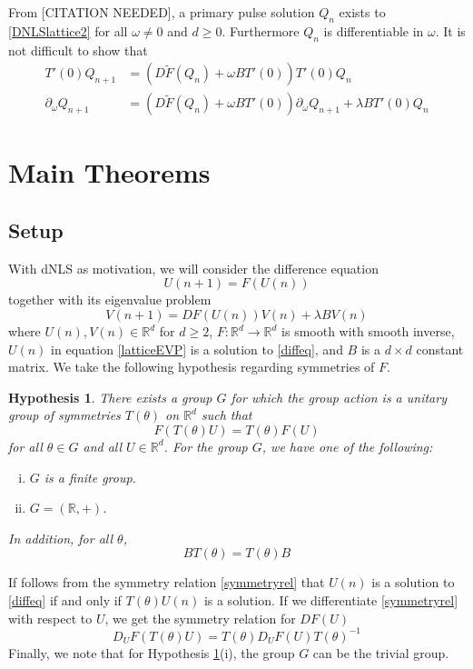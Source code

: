 \documentclass[12pt]{article}
\def\R{{\mathbb R}}
\newtheorem{hypothesis}{Hypothesis}
\begin{document}
From [CITATION NEEDED], a primary pulse solution $Q_n$ exists to \eqref{DNLSlattice2} for all $\omega \neq 0$ and $d \geq 0$. Furthermore $Q_n$ is differentiable in $\omega$. It is not difficult to show that
\begin{align}
T'(0) Q_{n+1} &= (D\tilde{F}(Q_n) + \omega B T'(0)) T'(0) Q_n \label{dNLSkernel} \\
\partial_\omega Q_{n+1} &= (D\tilde{F}(Q_n) + \omega B T'(0)) \partial_\omega Q_{n+1} + \lambda B T'(0) Q_n \label{dNLSgenkernel}
\end{align}

\section{Main Theorems}

\subsection{Setup}

With dNLS as motivation, we will consider the difference equation
\begin{equation}\label{diffeq}
U(n+1) = F(U(n))
\end{equation}
together with its eigenvalue problem
\begin{equation}\label{latticeEVP}
V(n+1) = DF(U(n)) V(n) + \lambda B V(n)
\end{equation}
where $U(n), V(n) \in \R^d$ for $d \geq 2$, $F: \R^d \rightarrow \R^d$ is smooth with smooth inverse, $U(n)$ in equation \eqref{latticeEVP} is a solution to \eqref{diffeq}, and $B$ is a $d \times d$ constant matrix. We take the following hypothesis regarding symmetries of $F$.

\begin{hypothesis}\label{symmetryhyp}
There exists a group $G$ for which the group action is a unitary group of symmetries $T(\theta)$ on $\R^d$ such that 
\begin{equation}\label{symmetryrel}
F(T(\theta)U) = T(\theta)F(U)
\end{equation}
for all $\theta \in G$ and all $U \in \R^d$. For the group $G$, we have one of the following:
\begin{enumerate}[(i)]
\item $G$ is a finite group.
\item $G = (\R, +)$.
\end{enumerate}
In addition, for all $\theta$, 
\begin{equation}\label{BTcommute}
B T(\theta) = T(\theta) B
\end{equation}
\end{hypothesis}
If follows from the symmetry relation \eqref{symmetryrel} that $U(n)$ is a solution to \eqref{diffeq} if and only if $T(\theta)U(n)$ is a solution. If we differentiate \eqref{symmetryrel} with respect to $U$, we get the symmetry relation for $DF(U)$
\begin{equation}\label{DFtheta}
D_U F(T(\theta)U) = T(\theta) D_U F(U)T(\theta)^{-1}
\end{equation}
Finally, we note that for Hypothesis \ref{symmetryhyp}(i), the group $G$ can be the trivial group. 
\end{document}
